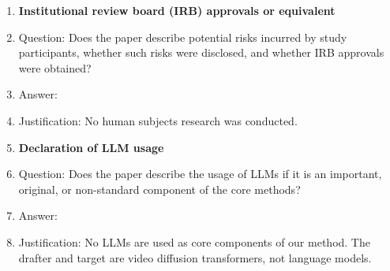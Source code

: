 \begin{enumerate}
\item {\bf Institutional review board (IRB) approvals or equivalent}
    \item[] Question: Does the paper describe potential risks incurred by study participants, whether such risks were disclosed, and whether IRB approvals were obtained?
    \item[] Answer: \answerNA{}
    \item[] Justification: No human subjects research was conducted.

\item {\bf Declaration of LLM usage}
    \item[] Question: Does the paper describe the usage of LLMs if it is an important, original, or non-standard component of the core methods?
    \item[] Answer: \answerNA{}
    \item[] Justification: No LLMs are used as core components of our method. The drafter and target are video diffusion transformers, not language models.

\end{enumerate}
